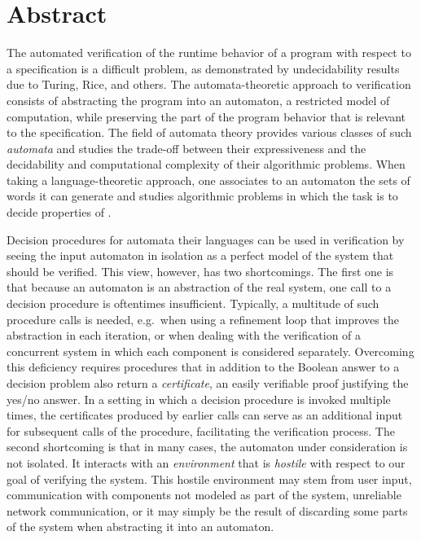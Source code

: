 \documentclass[../../diss.tex]{subfiles}
\begin{document}
\chapter*{\centering Abstract}%
%

The automated verification of the runtime behavior of a program with respect to a specification is a difficult problem, as demonstrated by undecidability results due to Turing, Rice, and others.
The automata-theoretic approach to verification consists of abstracting the program into an automaton, a restricted model of computation, while preserving the part of the program behavior that is relevant to the specification.
The field of automata theory provides various classes of such \emph{automata} and studies the trade-off between their expressiveness and the decidability and computational complexity of their algorithmic problems.
When taking a language-theoretic approach, one associates to an automaton the sets of words it can generate and studies algorithmic problems in which the task is to decide properties of .

Decision procedures for automata \resp their languages can be used in verification by seeing the input automaton in isolation as a perfect model of the system that should be verified.
This view, however, has two shortcomings.
The first one is that because an automaton is an abstraction of the real system, one call to a decision procedure is oftentimes insufficient.
Typically, a multitude of such procedure calls is needed, e.g.~when using a refinement loop that improves the abstraction in each iteration, or when dealing with the verification of a concurrent system in which each component is considered separately.
Overcoming this deficiency requires procedures that in addition to the Boolean answer to a decision problem also return a \emph{certificate}, an easily verifiable proof justifying the yes/no answer.
In a setting in which a decision procedure is invoked multiple times, the certificates produced by earlier calls can serve as an additional input for subsequent calls of the procedure, facilitating the verification process.
%
The second shortcoming is that in many cases, the automaton under consideration is not isolated.
It interacts with an \emph{environment} that is \emph{hostile} with respect to our goal of verifying the system.
This hostile environment may stem from user input, communication with components not modeled as part of the system, unreliable network communication, or it may simply be the result of discarding some parts of the system when abstracting it into an automaton.
\end{document}
